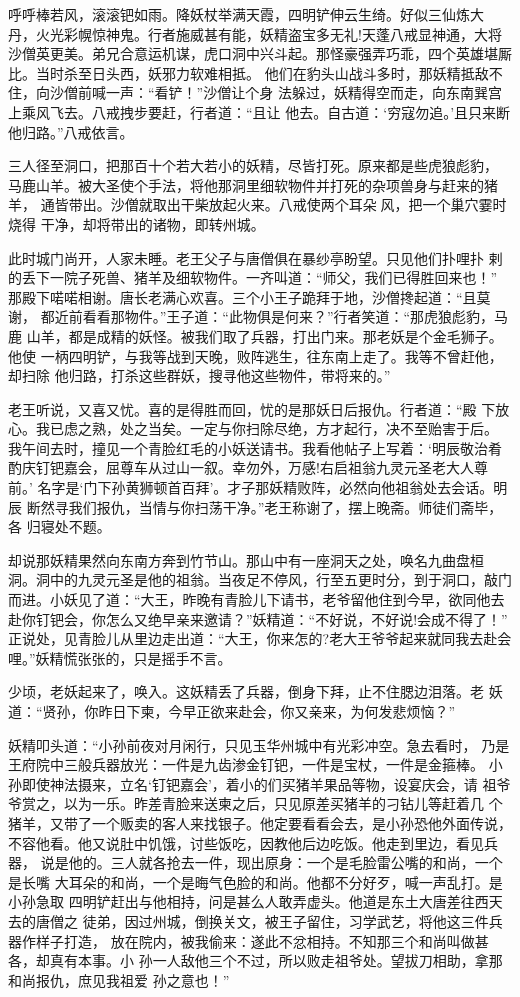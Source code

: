 呼呼棒若风，滚滚钯如雨。降妖杖举满天霞，四明铲伸云生绮。好似三仙炼大
丹，火光彩幌惊神鬼。行者施威甚有能，妖精盗宝多无礼!天蓬八戒显神通，大将
沙僧英更美。弟兄合意运机谋，虎口洞中兴斗起。那怪豪强弄巧乖，四个英雄堪厮
比。当时杀至日头西，妖邪力软难相抵。
他们在豹头山战斗多时，那妖精抵敌不住，向沙僧前喊一声：“看铲！”沙僧让个身
法躲过，妖精得空而走，向东南巽宫上乘风飞去。八戒拽步要赶，行者道：“且让
他去。自古道：‘穷寇勿追。’且只来断他归路。”八戒依言。

三人径至洞口，把那百十个若大若小的妖精，尽皆打死。原来都是些虎狼彪豹，
马鹿山羊。被大圣使个手法，将他那洞里细软物件并打死的杂项兽身与赶来的猪羊，
通皆带出。沙僧就取出干柴放起火来。八戒使两个耳朵风，把一个巢穴霎时烧得
干净，却将带出的诸物，即转州城。

此时城门尚开，人家未睡。老王父子与唐僧俱在暴纱亭盼望。只见他们扑哩扑
剌的丢下一院子死兽、猪羊及细软物件。一齐叫道：“师父，我们已得胜回来也！”
那殿下喏喏相谢。唐长老满心欢喜。三个小王子跪拜于地，沙僧搀起道：“且莫谢，
都近前看看那物件。”王子道：“此物俱是何来？”行者笑道：“那虎狼彪豹，马鹿
山羊，都是成精的妖怪。被我们取了兵器，打出门来。那老妖是个金毛狮子。他使
一柄四明铲，与我等战到天晚，败阵逃生，往东南上走了。我等不曾赶他，却扫除
他归路，打杀这些群妖，搜寻他这些物件，带将来的。”

老王听说，又喜又忧。喜的是得胜而回，忧的是那妖日后报仇。行者道：“殿
下放心。我已虑之熟，处之当矣。一定与你扫除尽绝，方才起行，决不至贻害于后。
我午间去时，撞见一个青脸红毛的小妖送请书。我看他帖子上写着：‘明辰敬治肴
酌庆钉钯嘉会，屈尊车从过山一叙。幸勿外，万感!右启祖翁九灵元圣老大人尊前。’
名字是‘门下孙黄狮顿首百拜’。才子那妖精败阵，必然向他祖翁处去会话。明辰
断然寻我们报仇，当情与你扫荡干净。”老王称谢了，摆上晚斋。师徒们斋毕，各
归寝处不题。

却说那妖精果然向东南方奔到竹节山。那山中有一座洞天之处，唤名九曲盘桓
洞。洞中的九灵元圣是他的祖翁。当夜足不停风，行至五更时分，到于洞口，敲门
而进。小妖见了道：“大王，昨晚有青脸儿下请书，老爷留他住到今早，欲同他去
赴你钉钯会，你怎么又绝早亲来邀请？”妖精道：“不好说，不好说!会成不得了！”
正说处，见青脸儿从里边走出道：“大王，你来怎的?老大王爷爷起来就同我去赴会
哩。”妖精慌张张的，只是摇手不言。

少顷，老妖起来了，唤入。这妖精丢了兵器，倒身下拜，止不住腮边泪落。老
妖道：“贤孙，你昨日下柬，今早正欲来赴会，你又亲来，为何发悲烦恼？”

妖精叩头道：“小孙前夜对月闲行，只见玉华州城中有光彩冲空。急去看时，
乃是王府院中三般兵器放光：一件是九齿渗金钉钯，一件是宝杖，一件是金箍棒。
小孙即使神法摄来，立名‘钉钯嘉会’，着小的们买猪羊果品等物，设宴庆会，请
祖爷爷赏之，以为一乐。昨差青脸来送柬之后，只见原差买猪羊的刁钻儿等赶着几
个猪羊，又带了一个贩卖的客人来找银子。他定要看看会去，是小孙恐他外面传说，
不容他看。他又说肚中饥饿，讨些饭吃，因教他后边吃饭。他走到里边，看见兵器，
说是他的。三人就各抢去一件，现出原身：一个是毛脸雷公嘴的和尚，一个是长嘴
大耳朵的和尚，一个是晦气色脸的和尚。他都不分好歹，喊一声乱打。是小孙急取
四明铲赶出与他相持，问是甚么人敢弄虚头。他道是东土大唐差往西天去的唐僧之
徒弟，因过州城，倒换关文，被王子留住，习学武艺，将他这三件兵器作样子打造，
放在院内，被我偷来：遂此不忿相持。不知那三个和尚叫做甚各，却真有本事。小
孙一人敌他三个不过，所以败走祖爷处。望拔刀相助，拿那和尚报仇，庶见我祖爱
孙之意也！”

